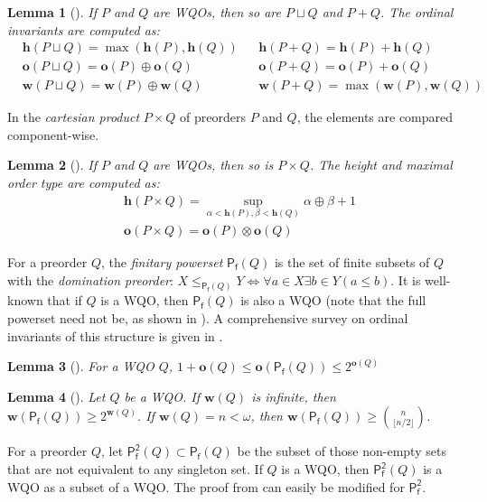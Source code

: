 \documentclass[runningheads]{llncs}
\let \leq \leqslant
\let \geq \geqslant
\renewcommand \S [1][]{\mathsf{P_f^{#1}}}
\def \h {\textbf{h}}
\def \o {\textbf{o}}
\def \w {\textbf{w}}
\newtheorem{lemma}{Lemma}
\begin{document}
\begin{lemma}[\cite{Abraham1999,deJongh1977,Dzamonja2020}]\label{h o w(cup)}
    If $P$ and $Q$ are WQOs, then so are $P \sqcup Q$ and $P + Q$. The ordinal invariants are computed as:
    \begin{align*}
        &\h(P \sqcup Q)=\max(\h(P),\h(Q))&&\h(P+Q)=\h(P)+\h(Q)\\
        &\o(P \sqcup Q)=\o(P)\oplus\o(Q)&&\o(P+Q)=\o(P)+\o(Q)\\
        &\w(P \sqcup Q)=\w(P)\oplus\w(Q)&&\w(P+Q)=\max(\w(P),\w(Q))
    \end{align*}
\end{lemma}

In the \textit{cartesian product} $P \times Q$ of preorders $P$ and $Q$, the elements are compared component-wise.

\begin{lemma}[\cite{deJongh1977}]\label{h o(times)}
    If $P$ and $Q$ are WQOs, then so is $P \times Q$. The height and maximal order type are computed as:
    \begin{align*}
        &\h(P \times Q) = \sup_{\alpha < \h(P), \beta < \h(Q)} \alpha\oplus\beta+1\\
        &\o(P \times Q) = \o(P) \otimes \o(Q)
    \end{align*}
\end{lemma}

For a preorder $Q$, the \textit{finitary powerset} $\S(Q)$ is the set of finite subsets of $Q$ with the \textit{domination preorder}: $X \leq_{\S(Q)} Y \iff \forall a \in X \exists b \in Y (a \leq b)$. It is well-known that if $Q$ is a WQO, then $\S(Q)$ is also a WQO (note that the full powerset need not be, as shown in \cite{Rado1954}). A comprehensive survey on ordinal invariants of this structure is given in \cite{Abriola2023}.

\begin{lemma}[{\cite[theorem 3.3]{Abriola2023}}]\label{o(S)}
    For a WQO $Q$, $1+\o(Q) \leq \o(\S(Q)) \leq 2^{\o(Q)}$
\end{lemma}

\begin{lemma}[{\cite[theorem 3.11]{Abriola2023}}]\label{w(S)}
    Let $Q$ be a WQO. If $\w(Q)$ is infinite, then $\w(\S(Q)) \geq 2^{\w(Q)}$. If $\w(Q) = n < \omega$, then $\w(\S(Q)) \geq \binom{n}{\lfloor n/2 \rfloor}$.
\end{lemma}

For a preorder $Q$, let $\S[2](Q) \subset \S(Q)$ be the subset of those non-empty sets that are not equivalent to any singleton set. If $Q$ is a WQO, then $\S[2](Q)$ is a WQO as a subset of a WQO. The proof from \cite[theorem 3.11]{Abriola2023} can easily be modified for $\S[2]$.
\end{document}
